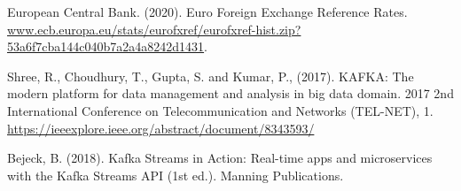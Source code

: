 \documentclass{article}
\begin{document}

\begin{thebibliography}{9}

European Central Bank. (2020). Euro Foreign Exchange Reference Rates. \url{www.ecb.europa.eu/stats/eurofxref/eurofxref-hist.zip?53a6f7cba144c040b7a2a4a8242d1431}.

Shree, R., Choudhury, T., Gupta, S. and Kumar, P., (2017). KAFKA: The modern platform for data management and analysis in big data domain. 2017 2nd International Conference on Telecommunication and Networks (TEL-NET), 1. \url{https://ieeexplore.ieee.org/abstract/document/8343593/}

Bejeck, B. (2018). Kafka Streams in Action: Real-time apps and microservices with the Kafka Streams API (1st ed.). Manning Publications.

\end{thebibliography}
\end{document}
